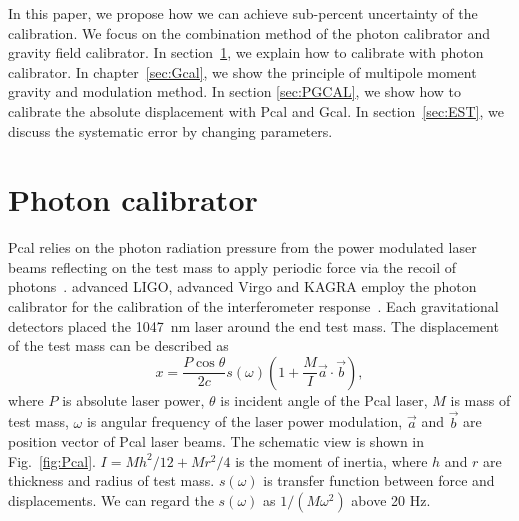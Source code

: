 \documentclass[%
 reprint,
superscriptaddress,
 amsmath,amssymb,
 aps,
]{revtex4-1}
\begin{document}
In this paper, we propose how we can achieve sub-percent uncertainty of the calibration. We focus on the combination method of the photon calibrator and gravity field calibrator.
In section~\ref{sec:Pcal}, we explain how to calibrate with photon calibrator. In chapter~\ref{sec:Gcal}, we show the principle of multipole moment gravity and modulation method.
In section \ref{sec:PGCAL}, we show how to calibrate the absolute displacement with Pcal and Gcal. In section~\ref{sec:EST}, we discuss the systematic error by changing parameters.

\section{Photon calibrator} \label{sec:Pcal}
Pcal relies on the photon radiation pressure from the power modulated laser beams reflecting on the test mass to apply periodic force via the recoil of photons~\cite{doi:10.1063/1.4967303}. 
advanced LIGO, advanced Virgo and KAGRA employ the photon calibrator for the calibration of the interferometer response~\cite{0264-9381-34-1-015002, KAGRA_Pcal,0264-9381-32-2-024001}. Each gravitational detectors placed the 1047~nm laser around the end test mass. The displacement of the test mass can be described as
\begin{equation}
 x = \frac{P \cos{\theta}}{2c} s(\omega)\left(1+\frac{M}{I}\vec{a} \cdot \vec{b} \right) , \label{pcal}
\end{equation}
where $P$ is absolute laser power, $\theta$ is incident angle of the Pcal laser, $M$ is mass of test mass, $\omega$ is angular frequency of the laser power modulation, $\vec{a}$ and $\vec{b}$ are position vector of Pcal laser beams. The schematic view is shown in Fig.~\ref{fig:Pcal}. $I=Mh^2/12+Mr^2/4$ is the moment of inertia, where $h$ and  $r$ are thickness and radius of test mass. $s(\omega)$ is transfer function between force and displacements. We can regard the $s(\omega)$ as $1/(M \omega^2)$ above 20 Hz. 
\end{document}
